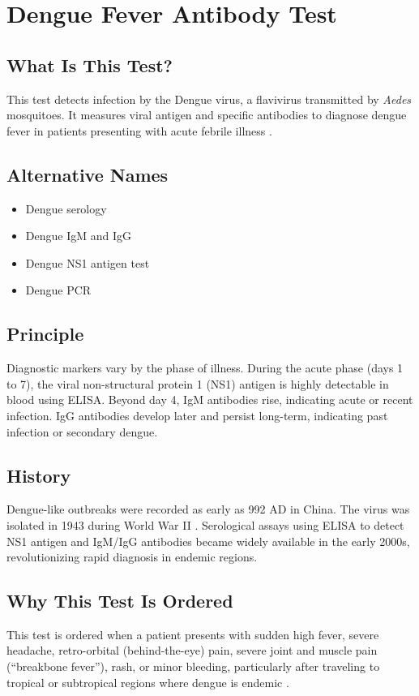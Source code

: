 \chapter{Dengue Fever Antibody Test}

\section*{What Is This Test?}
This test detects infection by the Dengue virus, a flavivirus transmitted by \textit{Aedes} mosquitoes. It measures viral antigen and specific antibodies to diagnose dengue fever in patients presenting with acute febrile illness \cite{gubler1998dengue}.

\section*{Alternative Names}
\begin{itemize}
  \item Dengue serology
  \item Dengue IgM and IgG
  \item Dengue NS1 antigen test
  \item Dengue PCR
\end{itemize}

\section*{Principle}
Diagnostic markers vary by the phase of illness. During the acute phase (days 1 to 7), the viral non-structural protein 1 (NS1) antigen is highly detectable in blood using ELISA. Beyond day 4, IgM antibodies rise, indicating acute or recent infection. IgG antibodies develop later and persist long-term, indicating past infection or secondary dengue.

\section*{History}
Dengue-like outbreaks were recorded as early as 992 AD in China. The virus was isolated in 1943 during World War II \cite{guzman2015dengue}. Serological assays using ELISA to detect NS1 antigen and IgM/IgG antibodies became widely available in the early 2000s, revolutionizing rapid diagnosis in endemic regions.

\section*{Why This Test Is Ordered}
This test is ordered when a patient presents with sudden high fever, severe headache, retro-orbital (behind-the-eye) pain, severe joint and muscle pain (``breakbone fever''), rash, or minor bleeding, particularly after traveling to tropical or subtropical regions where dengue is endemic \cite{who2009dengue}.

